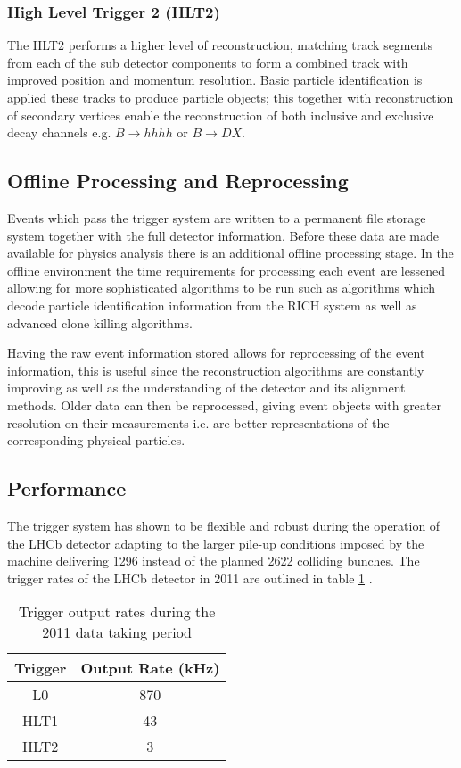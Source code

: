 \subsubsection*{High Level Trigger 2 (HLT2)}
The HLT2 performs a higher level of reconstruction, matching track segments from each of the sub detector components to form a combined track with improved position and momentum resolution. Basic particle identification is applied these tracks to produce particle objects; this together with reconstruction of secondary vertices enable the reconstruction of both inclusive and exclusive decay channels e.g. $B \rightarrow hhhh$ or $B \rightarrow DX$. 

\subsection*{Offline Processing and Reprocessing}
Events which pass the trigger system are written to a permanent file storage system together with the full detector information. Before these data are made available for physics analysis there is an additional offline processing stage. In the offline environment the time requirements for processing each event are lessened allowing for more sophisticated algorithms to be run such as algorithms which decode particle identification information from the RICH system as well as advanced clone killing algorithms. 

Having the raw event information stored allows for reprocessing of the event information, this is useful since the reconstruction algorithms are constantly improving as well as the understanding of the detector and its alignment methods. Older data can then be reprocessed, giving event objects with greater resolution on their measurements i.e. are better representations of the corresponding physical particles.

\subsection*{Performance}

The trigger system has shown to be flexible and robust during the operation of the LHCb detector adapting to the larger pile-up conditions imposed by the machine delivering 1296 instead of the planned 2622 colliding bunches. The trigger rates of the LHCb detector in 2011 are outlined in table \ref{table: trigger performance} \cite{Aaij:1493820}.

\begin{table}[htdp]
	\caption{Trigger output rates during the 2011 data taking period}
	\begin{center}
		\begin{tabular}{|c|c|}
			\hline
			Trigger & Output Rate (kHz) \\
			\hline
			L0 & 870 \\
			HLT1 & 43 \\
			HLT2 & 3 \\
			\hline
		\end{tabular}
	\end{center}
	\label{table: trigger performance}
\end{table}%


